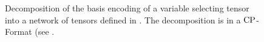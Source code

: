 
%




\begin{figure}[h]
\begin{center}
	
\end{center}
\caption{Decomposition of the basis encoding of a variable selecting tensor into a network of tensors defined in .
	The decomposition is in a $\mathrm{CP}$-Format (see . %
}
\label{fig:SelectorDecomposition}
\end{figure}




